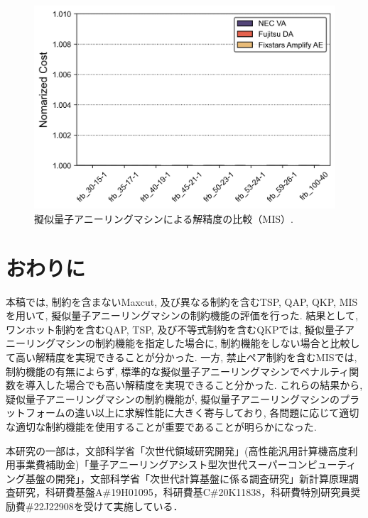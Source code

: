 \documentclass[submit,techrep,noauthor]{ipsj}
\begin{document}
\begin{figure}[ht]
\centering
\includegraphics[bb=0 0 700 250, width=15cm]{speed_vs_constraint_MIS.png}
\caption{擬似量子アニーリングマシンによる解精度の比較（MIS）.}
\label{MIS_speed_vs_const}
\end{figure}

\section{おわりに}
本稿では, 制約を含まないMaxcut, 及び異なる制約を含むTSP, QAP, QKP, MISを用いて, 擬似量子アニーリングマシンの制約機能の評価を行った. 結果として, ワンホット制約を含むQAP, TSP, 及び不等式制約を含むQKPでは, 擬似量子アニーリングマシンの制約機能を指定した場合に, 制約機能をしない場合と比較して高い解精度を実現できることが分かった. 一方, 禁止ペア制約を含むMISでは, 制約機能の有無によらず, 標準的な擬似量子アニーリングマシンでペナルティ関数を導入した場合でも高い解精度を実現できること分かった. 
これらの結果から, 疑似量子アニーリングマシンの制約機能が, 擬似量子アニーリングマシンのプラットフォームの違い以上に求解性能に大きく寄与しており, 各問題に応じて適切な適切な制約機能を使用することが重要であることが明らかになった.

\begin{acknowledgment}
本研究の一部は，文部科学省「次世代領域研究開発」(高性能汎用計算機高度利用事業費補助金)「量子アニーリングアシスト型次世代スーパーコンピューティング基盤の開発」，文部科学省「次世代計算基盤に係る調査研究」新計算原理調査研究，科研費基盤A\#19H01095，科研費基C\#20K11838，科研費特別研究員奨励費\#22J22908を受けて実施している．
\end{acknowledgment}
\end{document}
